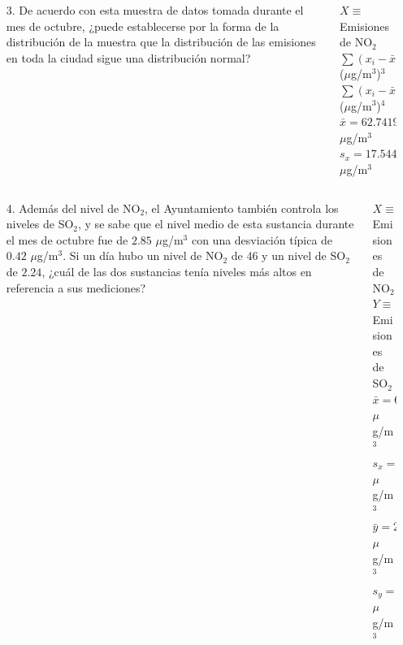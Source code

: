\documentclass[aspectratio=149,10pt,t]{beamer}
\begin{document}
\begin{frame}
	\begin{columns}
		\begin{column}[T]{0.55\textwidth}
			\begin{enumerate}
				\item[3.] De acuerdo con esta muestra de datos tomada durante el mes de octubre, ¿puede establecerse por la forma de la distribución de la muestra que la distribución de las emisiones en toda la ciudad sigue una distribución normal?
			\end{enumerate}
		\end{column}
		\begin{column}[T]{0.45\textwidth}
			\begin{datos}
				$X\equiv$ Emisiones de NO$_2$\\
				$\sum (x_i-\bar x)^3=93995.838$ ($\mu$g/m$^3$)$^3$\\
				$\sum (x_i-\bar x)^4=7766271.021$ ($\mu$g/m$^3$)$^4$\\
				$\bar x = 62.7419$ $\mu$g/m$^3$\\
				$s_x=17.5444$ $\mu$g/m$^3$
			\end{datos}
		\end{column}
	\end{columns}
\end{frame}


\begin{frame}
	\begin{columns}
		\begin{column}[T]{0.65\textwidth}
			\begin{enumerate}
				\item[4.] Además del nivel de NO$_2$, el Ayuntamiento también controla los niveles de SO$_2$, y se sabe que el nivel medio de esta sustancia durante el mes de octubre fue de $2.85$ $\mu$g/m$^3$ con una desviación típica de $0.42$ $\mu$g/m$^3$. 
				Si un día hubo un nivel de NO$_2$ de 46 y un nivel de SO$_2$ de $2.24$, ¿cuál de las dos sustancias tenía niveles más altos en referencia a sus mediciones?
			\end{enumerate}
		\end{column}
		\begin{column}[T]{0.35\textwidth}
			\begin{datos}
				$X\equiv$ Emisiones de NO$_2$\\
				$Y\equiv$ Emisiones de SO$_2$\\
				$\bar x = 62.7419$ $\mu$g/m$^3$\\
				$s_x=17.5444$ $\mu$g/m$^3$\\
				$\bar y=2.85$ $\mu$g/m$^3$\\
				$s_y=0.42$ $\mu$g/m$^3$
			\end{datos}
		\end{column}
	\end{columns}
\end{frame}
\end{document}
